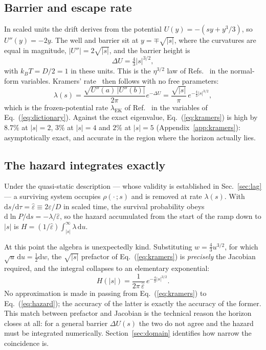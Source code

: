 \documentclass[%
 aip,
 cha,
 amsmath,amssymb,
 reprint,
 superscriptaddress,
 floatfix,
]{revtex4-2}
\newcommand{\dd}{\mathrm{d}}
\newcommand{\Sig}{\hat\varepsilon}
\begin{document}
\subsection{Barrier and escape rate}

In scaled units the drift derives from the potential $U(y)=-(sy+y^3/3)$, so $U''(y)=-2y$.  The well and barrier sit at $y=\mp\sqrt{|s|}$, where the curvatures are equal in magnitude, $|U''|=2\sqrt{|s|}$, and the barrier height is
\begin{equation}
\label{eq:barrier}
\Delta U=\tfrac43|s|^{3/2},
\end{equation}
with $k_BT=D/2=1$ in these units.  This is the $\eta^{3/2}$ law of Refs.~\cite{Kurkijarvi1972,DykmanKrivoglaz1980,Victora1989,DykmanGoldingRyvkine2004} in the normal-form variables.  Kramers' rate~\cite{Kramers1940,Hanggi1990} then follows with no free parameters:
\begin{equation}
\label{eq:kramers}
\lambda(s)=\frac{\sqrt{U''(a)\,|U''(b)|}}{2\pi}e^{-\Delta U}
=\frac{\sqrt{|s|}}{\pi}\,e^{-\frac43|s|^{3/2}} ,
\end{equation}
which is the frozen-potential rate $\lambda_{\mathrm{EK}}$ of Ref.~\cite{HerbertBouchet2017} in the variables of Eq.~(\ref{eq:dictionary}).  Against the exact eigenvalue, Eq.~(\ref{eq:kramers}) is high by $8.7\%$ at $|s|=2$, $3\%$ at $|s|=4$ and $2\%$ at $|s|=5$ (Appendix~\ref{app:kramers}): asymptotically exact, and accurate in the region where the horizon actually lies.

\subsection{The hazard integrates exactly}

Under the quasi-static description --- whose validity is established in Sec.~\ref{sec:lag} --- a surviving system occupies $\rho(\cdot\,;s)$ and is removed at rate $\lambda(s)$.  With $\dd s/\dd\tau=\Sig\equiv2\varepsilon/D$ in scaled time, the survival probability obeys $\dd\ln P/\dd s=-\lambda/\Sig$, so the hazard accumulated from the start of the ramp down to $|s|$ is $H=(1/\Sig)\int_{|s|}^{\infty}\lambda\,\dd u$.

At this point the algebra is unexpectedly kind.  Substituting $w=\tfrac43u^{3/2}$, for which $\sqrt u\,\dd u=\tfrac12\dd w$, the $\sqrt{|s|}$ prefactor of Eq.~(\ref{eq:kramers}) is \emph{precisely} the Jacobian required, and the integral collapses to an elementary exponential:
\begin{equation}
\label{eq:hazard}
H(|s|)=\frac{1}{2\pi\,\Sig}\,e^{-\frac43|s|^{3/2}} .
\end{equation}
No approximation is made in passing from Eq.~(\ref{eq:kramers}) to Eq.~(\ref{eq:hazard}); the accuracy of the latter is exactly the accuracy of the former.  This match between prefactor and Jacobian is the technical reason the horizon closes at all: for a general barrier $\Delta U(s)$ the two do not agree and the hazard must be integrated numerically.  Section~\ref{sec:domain} identifies how narrow the coincidence is.
\end{document}
